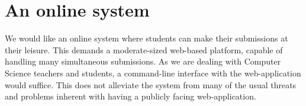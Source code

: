 
\section{An online system}

We would like an online system where students can make their submissions at
their leisure. This demands a moderate-sized web-based platform, capable of
handling many simultaneous submissions. As we are dealing with Computer Science
teachers and students, a command-line interface with the web-application would
suffice. This does not alleviate the system from many of the usual threats and
problems inherent with having a publicly facing web-application.

